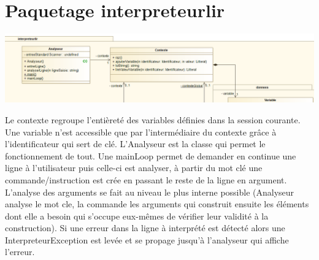 \section{Paquetage interpreteurlir}
\begin{center}\includegraphics[scale=0.60]{fichiers/dossierPartieConception/img/COO/COO_prototype_1/PackageInterpreteurlir}\end{center}
\par Le contexte regroupe l'entièreté des variables définies dans la session courante. Une variable n'est accessible que par l'intermédiaire du contexte grâce à l'identificateur qui sert de clé. L'Analyseur est la classe qui permet le fonctionnement de tout. Une mainLoop permet de demander en continue une ligne à l'utilisateur puis celle-ci est analyser, à partir du mot clé une commande/instruction est crée en passant le reste de la ligne en argument. L'analyse des arguments se fait au niveau le plus interne possible (Analyseur analyse le mot cle, la commande les arguments qui construit ensuite les éléments dont elle a besoin qui s'occupe eux-mêmes de vérifier leur validité à la construction). Si une erreur dans la ligne à interprété est détecté alors une InterpreteurException est levée et se propage jusqu'à l'analyseur qui affiche l'erreur.

